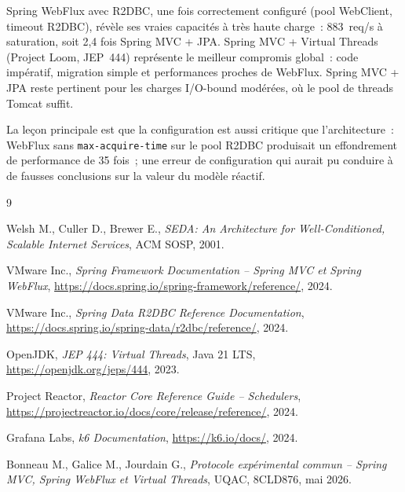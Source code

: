 Spring WebFlux avec R2DBC, une fois correctement configuré (pool WebClient, timeout R2DBC), révèle
ses vraies capacités à très haute charge~: 883~req/s à saturation, soit 2,4 fois Spring MVC + JPA.
Spring MVC + Virtual Threads (Project Loom, JEP~444) représente le meilleur compromis
global~: code impératif, migration simple et performances proches de WebFlux. Spring MVC + JPA
reste pertinent pour les charges I/O-bound modérées, où le pool de threads Tomcat suffit.

La leçon principale est que la configuration est aussi critique que l'architecture~: WebFlux sans
\texttt{max-acquire-time} sur le pool R2DBC produisait un effondrement de performance de 35
fois~; une erreur de configuration qui aurait pu conduire à de fausses conclusions sur la valeur
du modèle réactif.

\begin{thebibliography}{9}

  Welsh M., Culler D., Brewer E.,
  \textit{SEDA: An Architecture for Well-Conditioned, Scalable Internet Services},
  ACM SOSP, 2001.

  VMware Inc.,
  \textit{Spring Framework Documentation -- Spring MVC et Spring WebFlux},
  \url{https://docs.spring.io/spring-framework/reference/}, 2024.

  VMware Inc.,
  \textit{Spring Data R2DBC Reference Documentation},
  \url{https://docs.spring.io/spring-data/r2dbc/reference/}, 2024.

  OpenJDK,
  \textit{JEP 444: Virtual Threads}, Java 21 LTS,
  \url{https://openjdk.org/jeps/444}, 2023.

  Project Reactor,
  \textit{Reactor Core Reference Guide -- Schedulers},
  \url{https://projectreactor.io/docs/core/release/reference/}, 2024.

  Grafana Labs,
  \textit{k6 Documentation},
  \url{https://k6.io/docs/}, 2024.

  Bonneau M., Galice M., Jourdain G.,
  \textit{Protocole exp{\'e}rimental commun -- Spring MVC, Spring WebFlux et Virtual Threads},
  UQAC, 8CLD876, mai 2026.

\end{thebibliography}
